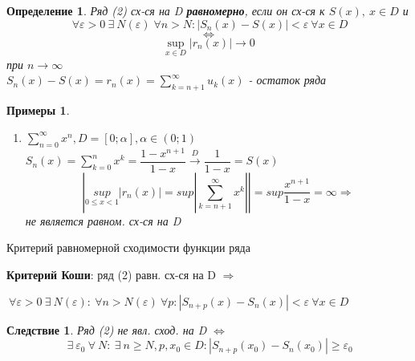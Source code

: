 \documentclass[a4paper, 12pt]{article}
\newtheorem{Definition}{Определение}
\newtheorem{Examples}{Примеры}
\newtheorem{Consequence}{Следствие}
\begin{document}
    \begin{Definition}
        Ряд (2) сх-ся на D \textbf{равномерно}, если он сх-ся к $S(x),
        \ x \in D$ и\\
        \[\ \forall \varepsilon > 0 \ \exists \  N(\varepsilon) \; \forall n > N:
        \left| S_n(x) - S(x)\right| < \varepsilon \ \forall x \in D \]
        \[\Leftrightarrow\]
        \[\underset{x \in D}{\sup} \left|r_n(x) \right| \rightarrow 0\]
        при $n \rightarrow \infty$ \\ 
        $S_n(x) - S(x) = r_n(x) = \displaystyle
        \sum^{\infty}_{k = n + 1} u_k(x)$  - остаток ряда
    \end{Definition}

    \begin{Examples}
        \leavevmode
        \begin{enumerate}
            \item
            $\displaystyle \sum ^{\infty}_{n = 0}x^n, D = [0; \alpha],
            \alpha \in (0; 1)$ \\
            $S_n(x) = \displaystyle \sum ^{n}_{k = 0} x^k =
            \dfrac{1 - x^{n + 1}}{1 - x} \xrightarrow{D} \dfrac{1}{1 - x} = S(x)$
            \[ \left| \underset{0 \leqslant x < 1}{sup} |r_n(x)| =  sup \left|
            \displaystyle \sum^{\infty}_{k = n + 1} x^k \right| \right| =
            sup \dfrac{x^{ n + 1}}{1 - x} = \infty \Rightarrow\]
            не является равном. сх-ся на D
        \end{enumerate}
    \end{Examples}

    \vspace{1cm}
    Критерий равномерной сходимости функции ряда

    \begin{flushleft}
    \textbf{Критерий Коши}: ряд (2) равн. сх-ся на D $\Rightarrow$\\
        
    \end{flushleft}
    $\ \forall \varepsilon > 0 \ \exists \  N(\varepsilon):
    \ \forall n > N(\varepsilon) \ \forall p:
    \left| S_{n + p}(x) - S_n(x) \right| < \varepsilon \ \forall x \in D$

    \begin{Consequence}
        Ряд (2) не явл. сход. на D $\Leftrightarrow$ \\
        \[\ \exists \  \varepsilon_0 \ \forall \ N: \ \exists \  n \ge N,
        p, x_0 \in D:
        \left| S_{n + p}(x_0) - S_n(x_0)\right| \ge \varepsilon_0\]
    \end{Consequence}
\end{document}
